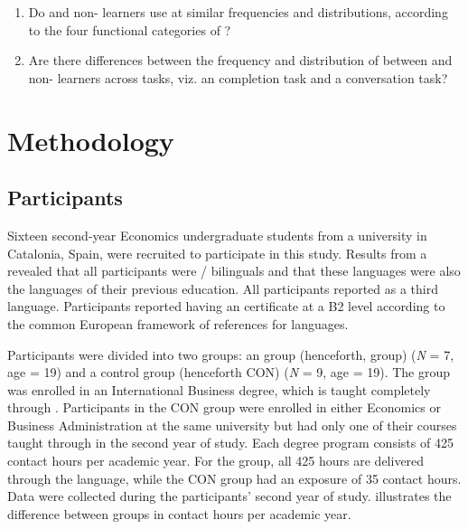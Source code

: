 \documentclass[output=paper]{langsci/langscibook}
\begin{document}
\begin{enumerate} 
\item Do  and non- learners use  at similar frequencies and distributions, according to the four functional categories of ? 
\item Are there differences between the frequency and distribution of  between  and non- learners across tasks, viz. an  completion task and a conversation task?
\end{enumerate}



\section{Methodology}


\subsection{Participants}


Sixteen second-year Economics undergraduate students from a university in Catalonia, Spain, were recruited to participate in this study. Results from a  revealed that all participants were / bilinguals and that these languages were also the languages of their previous education. All participants reported  as a third language. Participants reported having an  certificate at a B2 level according to the common European framework of references for languages. 

Participants were divided into two groups: an  group (henceforth,  group) (\textit{N} = 7, age = 19) and a control group (henceforth CON) (\textit{N} = 9, age = 19). The  group was enrolled in an International Business degree, which is taught completely through . Participants in the CON group were enrolled in either Economics or Business Administration at the same university but had only one of their courses taught through  in the second year of study. Each degree program consists of 425 contact hours per academic year. For the  group, all 425 hours are delivered through the  language, while the CON group had an exposure of 35 contact hours. Data were collected during the participants’ second year of study.  illustrates the difference between groups in  contact hours per academic year.
\end{document}
